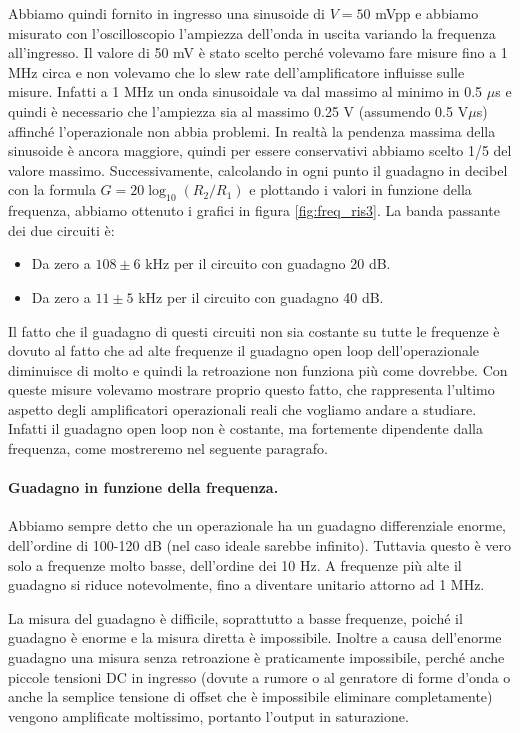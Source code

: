 Abbiamo quindi fornito in ingresso una sinusoide di $V = 50$ mVpp e abbiamo misurato con
l'oscilloscopio l'ampiezza dell'onda in uscita variando la frequenza all'ingresso.
Il valore di 50 mV è stato scelto perché volevamo fare misure fino a 1 MHz circa e non volevamo
che lo slew rate dell'amplificatore influisse sulle misure. Infatti a 1 MHz un onda sinusoidale
va dal massimo al minimo in 0.5 $\mu$s e quindi è necessario che l'ampiezza sia al massimo 0.25 V (assumendo 0.5 V$\mu$s)
affinché l'operazionale non abbia problemi. In realtà la pendenza massima della sinusoide è ancora maggiore,
quindi per essere conservativi abbiamo scelto 1/5 del valore massimo. Successivamente,
calcolando in ogni punto il guadagno in decibel con la formula $G = 20\log_{10}(R_2/R_1)$
e plottando i valori in funzione della frequenza, abbiamo ottenuto i grafici in figura \ref{fig:freq_ris3}.
La banda passante dei due circuiti è:

\begin{itemize}
    \item{Da zero a $108 \pm 6$ kHz per il circuito con guadagno 20 dB.}
    \item{Da zero a $11 \pm 5$ kHz per il circuito con guadagno 40 dB.}
\end{itemize}

Il fatto che il guadagno di questi circuiti non sia costante su tutte le frequenze è dovuto al fatto che ad alte frequenze
il guadagno open loop dell'operazionale diminuisce di molto e quindi la retroazione non funziona più come dovrebbe.
Con queste misure volevamo mostrare proprio questo fatto, che rappresenta l'ultimo aspetto degli amplificatori
operazionali reali che vogliamo andare a studiare. Infatti il guadagno open loop non è costante, ma fortemente dipendente
dalla frequenza, come mostreremo nel seguente paragrafo.

\paragraph{Guadagno in funzione della frequenza.}

Abbiamo sempre detto che un operazionale ha un guadagno differenziale enorme, dell'ordine di 100-120 dB
(nel caso ideale sarebbe infinito). Tuttavia questo è vero solo a frequenze molto basse, dell'ordine dei
10 Hz. A frequenze più alte il guadagno si riduce notevolmente, fino a diventare unitario attorno ad 1 MHz.

La misura del guadagno è difficile, soprattutto a basse frequenze, poiché il guadagno è enorme e la misura
diretta è impossibile. Inoltre a causa dell'enorme guadagno una misura senza retroazione è praticamente
impossibile, perché anche piccole tensioni DC in ingresso (dovute a rumore o al genratore di forme d'onda o anche la semplice
tensione di offset che è impossibile eliminare completamente)
vengono amplificate moltissimo, portanto l'output in saturazione.

